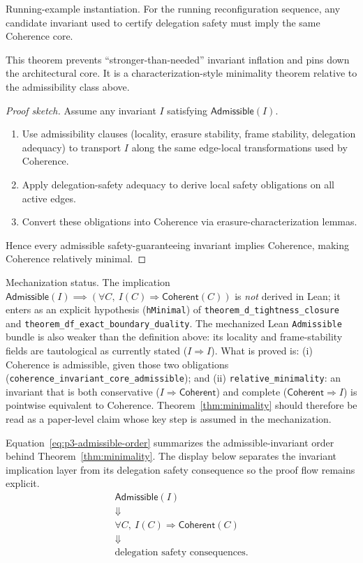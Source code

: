 \documentclass[a4paper,10pt,twocolumn,english]{article}
\numberwithin{equation}{section}
\theoremstyle{paperdef}
\theoremstyle{paperplain}
\theoremstyle{paperdef}
\theoremstyle{paperremark}
\theoremstyle{paperdef}
\newcommand{\Coherent}{\ensuremath{\mathsf{Coherent}}}
\newcommand{\Admissible}{\ensuremath{\mathsf{Admissible}}}
\begin{document}
Running-example instantiation. For the running reconfiguration sequence, any
candidate invariant used to certify delegation safety must imply the same
Coherence core.

This theorem prevents ``stronger-than-needed'' invariant inflation and pins down the architectural core.
It is a characterization-style minimality theorem relative to the admissibility class above.

\begin{proof}[Proof sketch]
	Assume any invariant $I$ satisfying $\Admissible(I)$.

	\begin{enumerate}
		\item Use admissibility clauses (locality, erasure stability, frame stability, delegation adequacy) to transport $I$ along the same edge-local transformations used by Coherence.
		\item Apply delegation-safety adequacy to derive local safety obligations on all active edges.
		\item Convert these obligations into Coherence via erasure-characterization lemmas.
	\end{enumerate}

	Hence every admissible safety-guaranteeing invariant implies Coherence, making Coherence relatively minimal.
\end{proof}

Mechanization status. The implication $\Admissible(I)\implies(\forall C,\ I(C)\Rightarrow\Coherent(C))$
is \emph{not} derived in Lean; it enters as an explicit hypothesis
(\texttt{hMinimal}) of \nolinkurl{theorem_d_tightness_closure} and
\nolinkurl{theorem_df_exact_boundary_duality}. The mechanized Lean \texttt{Admissible}
bundle is also weaker than the definition above: its locality and frame-stability
fields are tautological as currently stated ($I\Rightarrow I$). What is proved is: (i) Coherence is admissible, given
those two obligations (\nolinkurl{coherence_invariant_core_admissible}); and (ii)
\nolinkurl{relative_minimality}: an invariant that is both conservative
($I\Rightarrow\Coherent$) and complete ($\Coherent\Rightarrow I$) is pointwise
equivalent to Coherence. Theorem~\ref{thm:minimality} should therefore be read as a
paper-level claim whose key step is assumed in the mechanization.

Equation~\ref{eq:p3-admissible-order} summarizes the admissible-invariant order behind Theorem~\ref{thm:minimality}.
The display below separates the invariant implication layer from its delegation
safety consequence so the proof flow remains explicit.
\begin{equation}
	\label{eq:p3-admissible-order}
	\begin{array}{c}
		\Admissible(I)
		\\
		\Downarrow
		\\
		\forall C,\ I(C)\Rightarrow \Coherent(C)
		\\
		\Downarrow
		\\
		\text{delegation safety consequences}.
	\end{array}
\end{equation}
\end{document}
